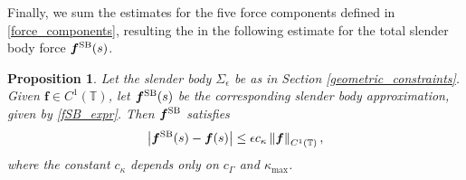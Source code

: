 \documentclass[11pt]{article}
\numberwithin{equation}{section}
\newcommand{\T}{\mathbb{T}}
\newcommand{\SB}{{\rm SB}}
\newcommand{\abs}[1]{\left\lvert #1 \right\rvert}
\newcommand{\norm}[1]{\left\lVert #1 \right\rVert}
\newcommand{\mc}[1]{\mathcal{#1}}
\newtheorem{proposition}[theorem]{Proposition}
\theoremstyle{definition}
\begin{document}
%
%
%
%
%

Finally, we sum the estimates for the five force components defined in \eqref{force_components}, resulting the in the following estimate for the total slender body force $\bm{f}^{\SB}(s)$. 
\begin{proposition}\label{fSB_est}
Let the slender body $\Sigma_\epsilon$ be as in Section \ref{geometric_constraints}. Given $\bm{f}\in C^1(\T)$, let $\bm{f}^{\SB}(s)$ be the corresponding slender body approximation, given by \eqref{fSB_expr}. Then $\bm{f}^{\SB}$ satisfies 
\begin{equation}
\abs{\bm{f}^{\SB}(s) - \bm{f}(s)} \le \epsilon c_\kappa \norm{\bm{f}}_{C^1(\T)},
\end{equation}
where the constant $c_\kappa$ depends only on $c_{\Gamma}$ and $\kappa_{\max}$.
\end{proposition}
\end{document}
